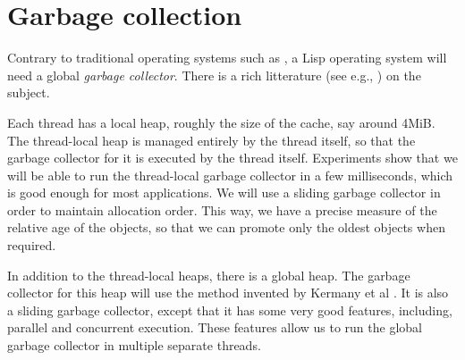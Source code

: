 \chapter{Garbage collection}

Contrary to traditional operating systems such as \unix{}, a Lisp
operating system will need a global \emph{garbage collector}.  There 
is a rich litterature (see e.g., \cite{Jones:2011:GCH:2025255}) on the
subject. 

Each thread has a local heap, roughly the size of the cache, say
around 4MiB.  The thread-local heap is managed entirely by the thread
itself, so that the garbage collector for it is executed by the thread
itself.  Experiments show that we will be able to run the thread-local
garbage collector in a few milliseconds, which is good enough for most
applications.  We will use a sliding garbage collector in order to
maintain allocation order.  This way, we have a precise measure of the
relative age of the objects, so that we can promote only the oldest
objects when required. 

In addition to the thread-local heaps, there is a global heap.  The
garbage collector for this heap will use the method invented by
Kermany et al \cite{Kermany:2006:CCI:1133981.1134023}.  It is also a
sliding garbage collector, except that it has some very good features,
including, parallel and concurrent execution.  These features allow us
to run the global garbage collector in multiple separate threads. 


